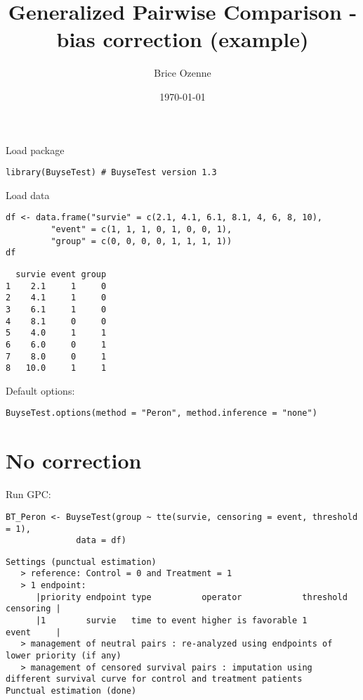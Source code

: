 \documentclass{article}
\author{Brice Ozenne}
\date{\today}
\title{Generalized Pairwise Comparison - bias correction (example)}
\begin{document}
\maketitle
Load package
\lstset{language=r,label= ,caption= ,captionpos=b,numbers=none}
\begin{lstlisting}
library(BuyseTest) # BuyseTest version 1.3
\end{lstlisting}

Load data
\lstset{language=r,label= ,caption= ,captionpos=b,numbers=none}
\begin{lstlisting}
df <- data.frame("survie" = c(2.1, 4.1, 6.1, 8.1, 4, 6, 8, 10), 
		 "event" = c(1, 1, 1, 0, 1, 0, 0, 1), 
		 "group" = c(0, 0, 0, 0, 1, 1, 1, 1))
df
\end{lstlisting}

\begin{verbatim}
  survie event group
1    2.1     1     0
2    4.1     1     0
3    6.1     1     0
4    8.1     0     0
5    4.0     1     1
6    6.0     0     1
7    8.0     0     1
8   10.0     1     1
\end{verbatim}

Default options:
\lstset{language=r,label= ,caption= ,captionpos=b,numbers=none}
\begin{lstlisting}
BuyseTest.options(method = "Peron", method.inference = "none")
\end{lstlisting}

\clearpage

\section{No correction}
\label{sec:org3d54615}

Run GPC:
\lstset{language=r,label= ,caption= ,captionpos=b,numbers=none}
\begin{lstlisting}
BT_Peron <- BuyseTest(group ~ tte(survie, censoring = event, threshold = 1),
		      data = df)
\end{lstlisting}

\begin{verbatim}
Settings (punctual estimation) 
   > reference: Control = 0 and Treatment = 1
   > 1 endpoint: 
      |priority endpoint type          operator            threshold censoring |
      |1        survie   time to event higher is favorable 1         event     |
   > management of neutral pairs : re-analyzed using endpoints of lower priority (if any) 
   > management of censored survival pairs : imputation using different survival curve for control and treatment patients 
Punctual estimation (done)
\end{verbatim}
\end{document}
